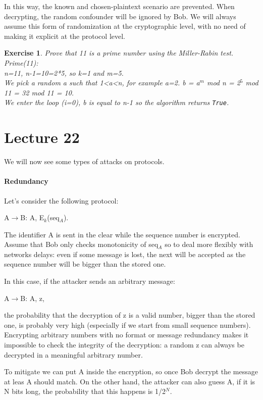 \documentclass[a4paper, 12pt]{report}
\newtheorem{exercise}{\textbf{Exercise}}
\begin{document}
In this way, the known and chosen-plaintext scenario are prevented. When decrypting, the random confounder will be ignored by Bob. We will always assume this form of randomization at the cryptographic level, with no need of making it explicit at the protocol level.

\begin{exercise}
	Prove that 11 is a prime number using the Miller-Rabin test.\\
	
	Prime(11):\\
	n=11, n-1=10=2*5, so k=1 and m=5.\\
	We pick a random a such that 1<a<n, for example a=2.
	b = a$^m$ mod n = 2$^5$ mod 11 = 32 mod 11 = 10.\\
	We enter the loop (i=0), b is equal to n-1 so the algorithm returns \texttt{True}.
\end{exercise} 

\chapter*{Lecture 22}
We will now see some types of attacks on protocols.

\subsubsection{Redundancy}
Let's consider the following protocol:
\begin{center}
	A$\rightarrow$B: A, E$_k$(seq$_A$).
\end{center}

The identifier A is sent in the clear while the sequence number is encrypted. Assume that Bob only checks monotonicity of seq$_A$ so to deal more flexibly with networks delays: even if some message is lost, the next will be accepted as the sequence number will be bigger than the stored one.

In this case, if the attacker sends an arbitrary message:
\begin{center}
	A$\rightarrow$B: A, z,
\end{center}
the probability that the decryption of z is a valid number, bigger than the stored one, is probably very high (especially if we start from small sequence numbers). Encrypting arbitrary numbers with no format or message redundancy makes it impossible to check the integrity of the decryption: a random z can always be decrypted in a meaningful arbitrary number.

To mitigate we can put A inside the encryption, so once Bob decrypt the message at leas A should match. On the other hand, the attacker can also guess A, if it is N bits long, the probability that this happens is 1/2$^N$.
\end{document}
